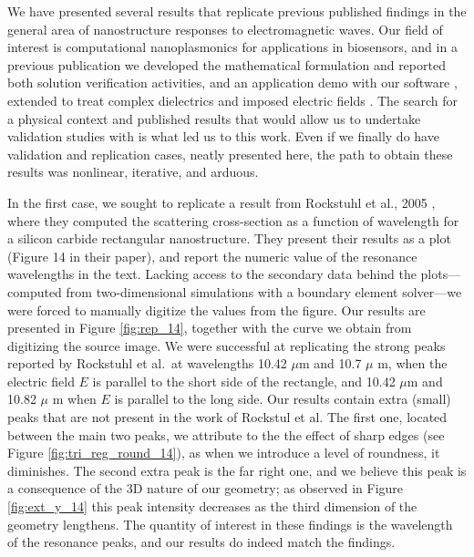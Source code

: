 
We have presented several results that replicate previous published findings in the general area of nanostructure responses to electromagnetic waves. 
Our field of interest is computational nanoplasmonics for applications in biosensors, and in a previous publication we developed the mathematical formulation and reported both solution verification activities, and an application demo with our software \pygbe, extended to treat complex dielectrics and imposed electric fields \cite{ClementiETal2019}.
The search for a physical context and published results that would allow us to undertake validation studies with \pygbe is what led us to this work. 
Even if we finally do have validation and replication cases, neatly presented here, the path to obtain these results was nonlinear, iterative, and arduous.

In the first case, we sought to replicate a result from Rockstuhl et al., 2005 \cite{rockstuhl2005}, where they computed the scattering cross-section as a function of wavelength for a silicon carbide rectangular nanostructure. 
They present their results as a plot (Figure 14 in their paper), and report the numeric value of the resonance wavelengths in the text. 
Lacking access to the secondary data behind the plots---computed from two-dimensional simulations with a boundary element solver---we were forced to manually digitize the values from the figure.
Our results are presented in Figure \ref{fig:rep_14}, together with the curve we obtain from digitizing the source image. 
We were successful at replicating the strong peaks reported  by Rockstuhl et al.\ at wavelengths
10.42 $\mu$m and 10.7 $\mu$ m,  when the electric field $E$ is parallel to the short side of the rectangle, and 10.42 $\mu$m and 10.82 $\mu$ m
when $E$ is parallel to the long side. Our results contain extra (small) peaks that are not present in the work of Rockstul et al.
The first one, located between the main two peaks, we attribute to the the effect of
sharp edges (see Figure \ref{fig:tri_reg_round_14}), as when we introduce a level of roundness, it diminishes. The second extra peak is the far right one, and we believe this
peak is a consequence of the 3D nature of our geometry; as observed in Figure \ref{fig:ext_y_14} this peak intensity
decreases as the third dimension of the geometry lengthens.
The quantity of interest in these findings is the wavelength of the resonance peaks, and our results do indeed match the findings.

